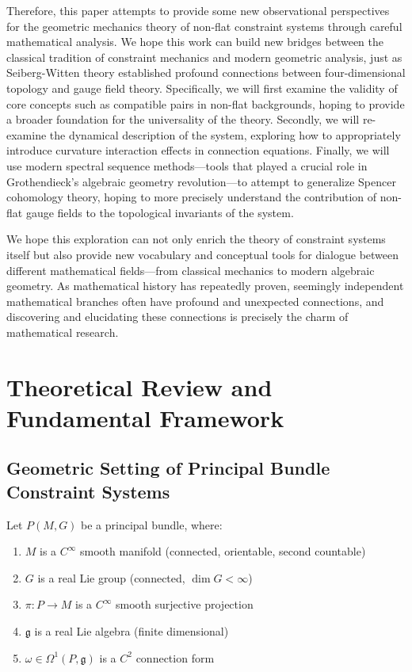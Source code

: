 \documentclass[a4paper,12pt]{extarticle}
\theoremstyle{definition}
\begin{document}
Therefore, this paper attempts to provide some new observational perspectives for the geometric mechanics theory of non-flat constraint systems through careful mathematical analysis. We hope this work can build new bridges between the classical tradition of constraint mechanics and modern geometric analysis, just as Seiberg-Witten theory\cite{seiberg1994electric} established profound connections between four-dimensional topology and gauge field theory. Specifically, we will first examine the validity of core concepts such as compatible pairs in non-flat backgrounds, hoping to provide a broader foundation for the universality of the theory. Secondly, we will re-examine the dynamical description of the system, exploring how to appropriately introduce curvature interaction effects in connection equations. Finally, we will use modern spectral sequence methods—tools that played a crucial role in Grothendieck's algebraic geometry revolution\cite{grothendieck1957theoremes}—to attempt to generalize Spencer cohomology theory, hoping to more precisely understand the contribution of non-flat gauge fields to the topological invariants of the system.

We hope this exploration can not only enrich the theory of constraint systems itself but also provide new vocabulary and conceptual tools for dialogue between different mathematical fields—from classical mechanics to modern algebraic geometry. As mathematical history has repeatedly proven, seemingly independent mathematical branches often have profound and unexpected connections, and discovering and elucidating these connections is precisely the charm of mathematical research.

\section{Theoretical Review and Fundamental Framework}

\subsection{Geometric Setting of Principal Bundle Constraint Systems}

Let $P(M, G)$ be a principal bundle, where:
\begin{enumerate}
\item $M$ is a $C^\infty$ smooth manifold (connected, orientable, second countable)
\item $G$ is a real Lie group (connected, $\dim G < \infty$)
\item $\pi: P \to M$ is a $C^\infty$ smooth surjective projection
\item $\mathfrak{g}$ is a real Lie algebra (finite dimensional)
\item $\omega \in \Omega^1(P, \mathfrak{g})$ is a $C^2$ connection form
\end{enumerate}
\end{document}
